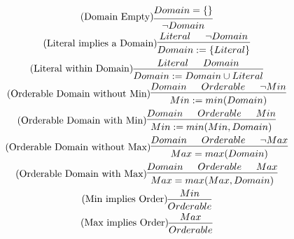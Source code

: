 \documentclass{article}
\begin{document}
\begin{gather}
  \tag{Domain Empty}
  \begin{prooftree}
    \hypo{Domain = \{\}}
    \infer1{\lnot Domain}
  \end{prooftree}
  \\
  \tag{Literal implies a Domain}
  \begin{prooftree}
    \hypo{Literal}
    \hypo{\lnot Domain}
    \infer2{Domain := \{Literal\}}
  \end{prooftree}
  \\
  \tag{Literal within Domain}
  \begin{prooftree}
    \hypo{Literal}
    \hypo{Domain}
    \infer2{Domain := Domain \cup {Literal}}
  \end{prooftree}
  \\
  \tag{Orderable Domain without Min}
  \begin{prooftree}
    \hypo{Domain}
    \hypo{Orderable}
    \hypo{\lnot Min}
    \infer3{Min := min(Domain)}
  \end{prooftree}
  \\
  \tag{Orderable Domain with Min}
  \begin{prooftree}
    \hypo{Domain}
    \hypo{Orderable}
    \hypo{Min}
    \infer3{Min := min(Min, Domain)}
  \end{prooftree}
  \\
  \tag{Orderable Domain without Max}
  \begin{prooftree}
    \hypo{Domain}
    \hypo{Orderable}
    \hypo{\lnot Max}
    \infer3{Max = max(Domain)}
  \end{prooftree}
  \\
  \tag{Orderable Domain with Max}
  \begin{prooftree}
    \hypo{Domain}
    \hypo{Orderable}
    \hypo{Max}
    \infer3{Max = max(Max, Domain)}
  \end{prooftree}
  \\
  \tag{Min implies Order}
  \begin{prooftree}
    \hypo{Min}
    \infer1{Orderable}
  \end{prooftree}
  \\
  \tag{Max implies Order}
  \begin{prooftree}
    \hypo{Max}
    \infer1{Orderable}

\end{prooftree}
\end{gather}
\end{document}
